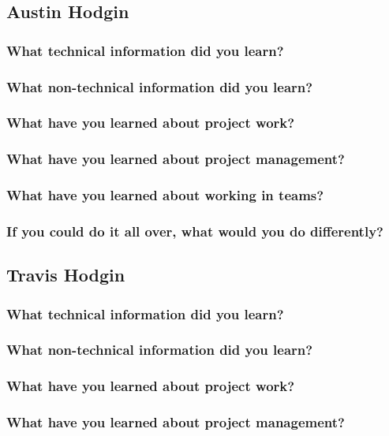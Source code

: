 \documentclass[onecolumn, draftclsnofoot,10pt, compsoc]{IEEEtran}
\begin{document}
		\subsection{Austin Hodgin}
			\subsubsection{What technical information did you learn?}
			\subsubsection{What non-technical information did you learn?}
			\subsubsection{What have you learned about project work?}
			\subsubsection{What have you learned about project management?}
			\subsubsection{What have you learned about working in teams?}
			\subsubsection{If you could do it all over, what would you do differently?}
		\subsection{Travis Hodgin}
			\subsubsection{What technical information did you learn?}
			\subsubsection{What non-technical information did you learn?}
			\subsubsection{What have you learned about project work?}
			\subsubsection{What have you learned about project management?}
\end{document}
